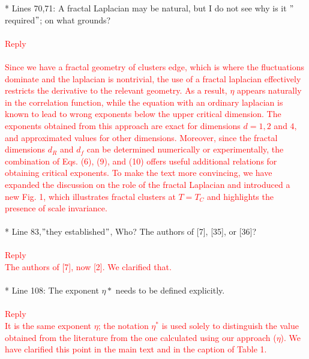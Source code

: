 \documentclass[prd,aps,nofootinbib]{revtex4}
\begin{document}
* Lines 70,71: A fractal Laplacian may be natural, but I do not see why is it $"$required$"$; on what grounds?\\
\\
\textcolor{red}{Reply}\\
\\%
\textcolor{red}{{Since we have a fractal geometry of clusters edge, which is where the fluctuations dominate and the laplacian is nontrivial, the use of a fractal laplacian effectively restricts the derivative to the relevant geometry. As a result, $\eta$ appears naturally in the correlation function, while the equation with an ordinary laplacian is known to lead to wrong exponents below the upper critical dimension. The exponents obtained from this approach are exact for dimensions $d=1,2$ and $4$, and approximated values for other dimensions. Moreover, since the fractal dimensions $d_R$ and $d_f$ can be determined numerically or experimentally, the combination of Eqs. (6), (9), and (10) offers useful additional relations for obtaining critical exponents. To make the text more convincing, we have expanded the discussion on the role of the fractal Laplacian and introduced a new Fig. 1, which illustrates fractal clusters at $T = T_C$ and highlights the presence of scale invariance.}} \\
\\



* Line 83,$"$they established$"$, Who? The authors of [7], [35], or [36]?\\
\\
\textcolor{red}{Reply}\\
\textcolor{red}{ The authors of [7], now [2]. We clarified that.}\\
\\


* Line 108: The exponent $\eta*$ needs to be defined explicitly.\\
\\
\textcolor{red}{Reply}\\
\textcolor{red}{ It is the same exponent $\eta$; the notation $\eta^*$ is used solely to distinguish the value obtained from the literature from the one calculated using our approach ($\eta$). We have clarified this point in the main text and in the caption of Table 1.}\\
\\
\end{document}
